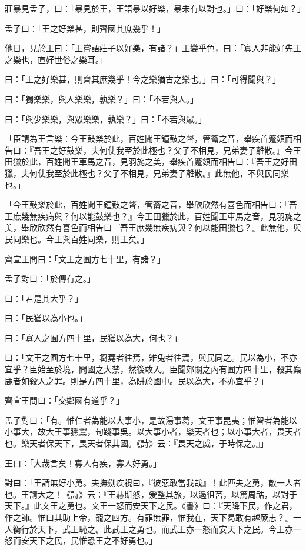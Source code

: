 
\begin{pinyinscope}
莊暴見孟子，曰：「暴見於王，王語暴以好樂，暴未有以對也。」曰：「好樂何如？」

孟子曰：「王之好樂甚，則齊國其庶幾乎！」

他日，見於王曰：「王嘗語莊子以好樂，有諸？」王變乎色，曰：「寡人非能好先王之樂也，直好世俗之樂耳。」

曰：「王之好樂甚，則齊其庶幾乎！今之樂猶古之樂也。」曰：「可得聞與？」

曰：「獨樂樂，與人樂樂，孰樂？」曰：「不若與人。」

曰：「與少樂樂，與眾樂樂，孰樂？」曰：「不若與眾。」

「臣請為王言樂：今王鼓樂於此，百姓聞王鐘鼓之聲，管籥之音，舉疾首蹙頞而相告曰：『吾王之好鼓樂，夫何使我至於此極也？父子不相見，兄弟妻子離散。』今王田獵於此，百姓聞王車馬之音，見羽旄之美，舉疾首蹙頞而相告曰：『吾王之好田獵，夫何使我至於此極也？父子不相見，兄弟妻子離散。』此無他，不與民同樂也。」

「今王鼓樂於此，百姓聞王鐘鼓之聲，管籥之音，舉欣欣然有喜色而相告曰：『吾王庶幾無疾病與？何以能鼓樂也？』今王田獵於此，百姓聞王車馬之音，見羽旄之美，舉欣欣然有喜色而相告曰『吾王庶幾無疾病與？何以能田獵也？』此無他，與民同樂也。今王與百姓同樂，則王矣。」

齊宣王問曰：「文王之囿方七十里，有諸？」

孟子對曰：「於傳有之。」

曰：「若是其大乎？」

曰：「民猶以為小也。」

曰：「寡人之囿方四十里，民猶以為大，何也？」

曰：「文王之囿方七十里，芻蕘者往焉，雉兔者往焉，與民同之。民以為小，不亦宜乎？臣始至於境，問國之大禁，然後敢入。臣聞郊關之內有囿方四十里，殺其麋鹿者如殺人之罪。則是方四十里，為阱於國中。民以為大，不亦宜乎？」

齊宣王問曰：「交鄰國有道乎？」

孟子對曰：「有。惟仁者為能以大事小，是故湯事葛，文王事昆夷；惟智者為能以小事大，故大王事獯鬻，句踐事吳。以大事小者，樂天者也；以小事大者，畏天者也。樂天者保天下，畏天者保其國。《詩》云：『畏天之威，于時保之。』」

王曰：「大哉言矣！寡人有疾，寡人好勇。」

對曰：「王請無好小勇。夫撫劍疾視曰，『彼惡敢當我哉』！此匹夫之勇，敵一人者也。王請大之！《詩》云：『王赫斯怒，爰整其旅，以遏徂莒，以篤周祜，以對于天下。』此文王之勇也。文王一怒而安天下之民。《書》曰：『天降下民，作之君，作之師。惟曰其助上帝，寵之四方。有罪無罪，惟我在，天下曷敢有越厥志？』一人衡行於天下，武王恥之。此武王之勇也。而武王亦一怒而安天下之民。今王亦一怒而安天下之民，民惟恐王之不好勇也。」


\end{pinyinscope}
